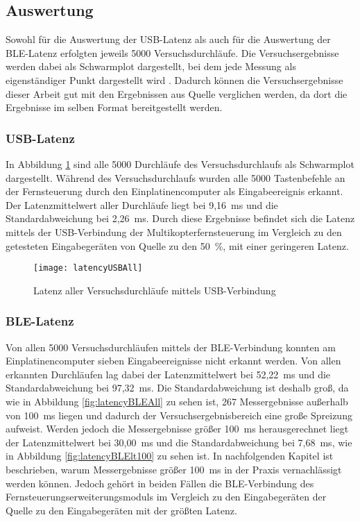 \subsection{Auswertung}
Sowohl für die Auswertung der USB-Latenz als auch für die Auswertung der \ac{BLE}-Latenz erfolgten jeweils 5000 Versuchsdurchläufe. Die Versuchsergebnisse werden dabei als Schwarmplot dargestellt, bei dem jede Messung als eigenständiger Punkt dargestellt wird \cite[S.~7]{wimmerLatenzStation}. Dadurch können die Versuchsergebnisse dieser Arbeit gut mit den Ergebnissen aus Quelle \cite{wimmerLatenzStation} verglichen werden, da dort die Ergebnisse im selben Format bereitgestellt werden. 

\subsubsection{USB-Latenz}
In Abbildung \ref{fig:latencyUSBAll} sind alle 5000 Durchläufe des Versuchsdurchlaufs als Schwarmplot dargestellt. Während des Versuchsdurchlaufs wurden alle 5000 Tastenbefehle an der Fernsteuerung durch den Einplatinencomputer als Eingabeereignis erkannt. Der Latenzmittelwert aller Durchläufe liegt bei 9,16~ms und die Standardabweichung bei 2,26~ms. Durch diese Ergebnisse befindet sich die Latenz mittels der USB-Verbindung der Multikopterfernsteuerung im Vergleich zu den getesteten Eingabegeräten von Quelle \cite{wimmerLatenzStation} zu den 50~\%, mit einer geringeren Latenz.

\begin{figure}[H]
    \centering
    \texttt{[image: latencyUSBAll]}
    \caption{Latenz aller Versuchsdurchläufe mittels USB-Verbindung}
    \label{fig:latencyUSBAll}
\end{figure}

\subsubsection{\ac{BLE}-Latenz}
Von allen 5000 Versuchsdurchläufen mittels der \ac{BLE}-Verbindung konnten am Einplatinencomputer sieben Eingabeereignisse nicht erkannt werden. Von allen erkannten Durchläufen lag dabei der Latenzmittelwert bei 52,22~ms und die Standardabweichung bei 97,32~ms. Die Standardabweichung ist deshalb groß, da wie in Abbildung \ref{fig:latencyBLEAll} zu sehen ist, 267 Messergebnisse außerhalb von 100~ms liegen und dadurch der Versuchsergebnisbereich eine große Spreizung aufweist. Werden jedoch die Messergebnisse größer 100~ms herausgerechnet liegt der Latenzmittelwert bei 30,00~ms und die Standardabweichung bei 7,68~ms, wie in Abbildung \ref{fig:latencyBLElt100} zu sehen ist. In nachfolgenden Kapitel ist beschrieben, warum Messergebnisse größer 100~ms in der Praxis vernachlässigt werden können. Jedoch gehört in beiden Fällen die \ac{BLE}-Verbindung des Fernsteuerungserweiterungsmoduls im Vergleich zu den Eingabegeräten der Quelle \cite{wimmerLatenzStation} zu den Eingabegeräten mit der größten Latenz.


